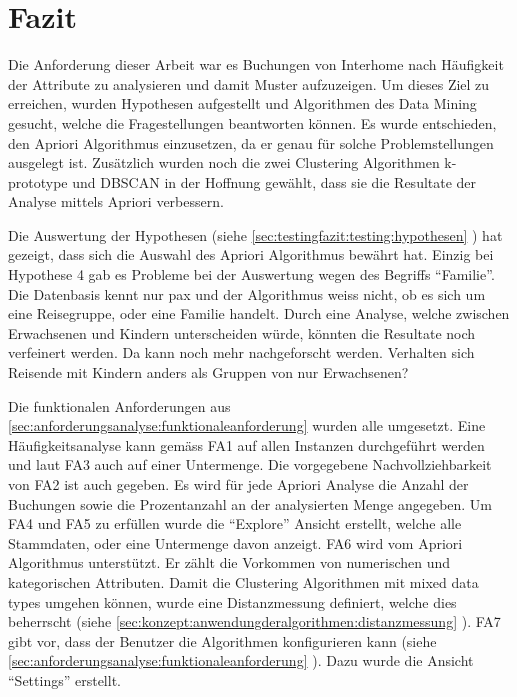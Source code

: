 \section{Fazit}
Die Anforderung dieser Arbeit war es Buchungen von Interhome nach Häufigkeit der Attribute zu analysieren und damit Muster aufzuzeigen. Um dieses Ziel zu erreichen, wurden Hypothesen aufgestellt und Algorithmen des Data Mining gesucht, welche die Fragestellungen beantworten können. Es wurde entschieden, den Apriori Algorithmus einzusetzen, da er genau für solche Problemstellungen ausgelegt ist. Zusätzlich wurden noch die zwei Clustering Algorithmen k-prototype und DBSCAN in der Hoffnung gewählt, dass sie die Resultate der Analyse mittels Apriori verbessern. 

Die Auswertung der Hypothesen (siehe \cref{sec:testingfazit:testing:hypothesen} ) hat gezeigt, dass sich die Auswahl des Apriori Algorithmus bewährt hat. Einzig bei Hypothese 4 gab es Probleme bei der Auswertung wegen des Begriffs "`Familie"'. Die Datenbasis kennt nur \gls{pax} und der Algorithmus weiss nicht, ob es sich um eine Reisegruppe, oder eine Familie handelt. Durch eine Analyse, welche zwischen Erwachsenen und Kindern unterscheiden würde, könnten die Resultate noch verfeinert werden. Da kann noch mehr nachgeforscht werden. Verhalten sich Reisende mit Kindern anders als Gruppen von nur Erwachsenen?

Die funktionalen Anforderungen aus \cref{sec:anforderungsanalyse:funktionaleanforderung}  wurden alle umgesetzt. Eine Häufigkeitsanalyse kann gemäss FA1 auf allen Instanzen durchgeführt werden und laut FA3 auch auf einer Untermenge. Die vorgegebene Nachvollziehbarkeit von FA2 ist auch gegeben. Es wird für jede Apriori Analyse die Anzahl der Buchungen sowie die Prozentanzahl an der analysierten Menge angegeben. Um FA4 und FA5 zu erfüllen wurde die "`Explore"' Ansicht erstellt, welche alle Stammdaten, oder eine Untermenge davon anzeigt. FA6 wird vom Apriori Algorithmus unterstützt. Er zählt die Vorkommen von numerischen und kategorischen Attributen. Damit die Clustering Algorithmen mit mixed data types umgehen können, wurde eine Distanzmessung definiert, welche dies beherrscht (siehe \cref{sec:konzept:anwendungderalgorithmen:distanzmessung} ). FA7 gibt vor, dass der Benutzer die Algorithmen konfigurieren kann (siehe \cref{sec:anforderungsanalyse:funktionaleanforderung} ). Dazu wurde die Ansicht "`Settings"' erstellt.  


